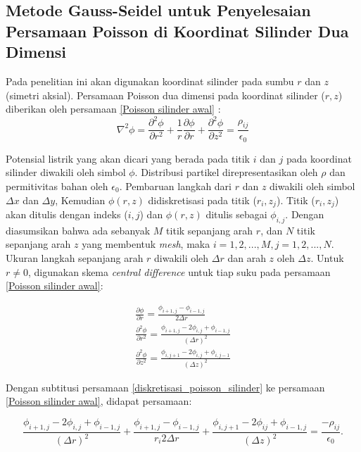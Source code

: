 \subsection{Metode Gauss-Seidel untuk Penyelesaian Persamaan Poisson di Koordinat Silinder Dua Dimensi}\label{gauss_seidel_silinder}
Pada penelitian ini akan digunakan koordinat silinder pada sumbu $r$ dan $z$ (simetri aksial). Persamaan Poisson dua dimensi pada koordinat silinder ($r, z$) diberikan oleh persamaan \eqref{Poisson silinder awal} \citep{Shiferaw2013}:
\begin{equation}\label{Poisson silinder awal}
    \nabla ^2 \phi = \frac{\partial^2\phi}{\partial r^2} + \frac{1}{r}\frac{\partial \phi}{\partial r}+\frac{\partial^2\phi}{\partial z^2}=\frac{\rho_{ij}}{\epsilon_0}
\end{equation}

Potensial listrik yang akan dicari yang berada pada titik $i$ dan $j$ pada koordinat silinder diwakili oleh simbol $\phi$. Distribusi partikel direpresentasikan oleh $\rho$ dan permitivitas bahan oleh $\epsilon_0$. Pembaruan langkah dari $r$ dan $z$ diwakili oleh simbol $\Delta x$ dan $\Delta y$, Kemudian $\phi(r,z)$ didiskretisasi pada titik ($r_i, z_j$). Titik ($r_i, z_j$) akan ditulis dengan indeks ($i,j$) dan $\phi(r,z)$ ditulis sebagai $\phi_{i,j}$. Dengan diasumsikan bahwa ada sebanyak $M$ titik sepanjang arah $r$, dan $N$ titik sepanjang arah $z$ yang membentuk \emph{mesh}, maka $i = 1,2,...,M, j=1,2,...,N$. Ukuran langkah sepanjang arah $r$ diwakili oleh $\Delta r$ dan arah $z$ oleh $\Delta z$. Untuk $r \neq 0$, digunakan skema \emph{central difference} untuk tiap suku pada persamaan \eqref{Poisson silinder awal}:

\begin{equation}\label{diskretisasi_poisson_silinder}
\begin{split}
    \frac{\partial \phi}{\partial r} = \frac{\phi_{i+1,j}-\phi_{i-1,j}}{2\Delta r}\\
    \frac{\partial^2 \phi}{\partial r^2} = \frac{\phi_{i+1,j}-2\phi_{i,j}+\phi_{i-1,j}}{(\Delta r)^2}\\
    \frac{\partial^2 \phi}{\partial z^2} = \frac{\phi_{i,j+1}-2\phi_{i,j}+\phi_{i,j-1}}{(\Delta z)^2}
\end{split}
\end{equation}

Dengan subtitusi persamaan \eqref{diskretisasi_poisson_silinder} ke persamaan \eqref{Poisson silinder awal}, didapat persamaan:

\begin{equation}
    \frac{\phi_{i+1,j}-2\phi_{i,j}+\phi_{i-1,j}}{(\Delta r)^2} + \frac{\phi_{i+1,j}-\phi_{i-1,j}}{r_i 2 \Delta r} + \frac{\phi_{i,j+1}-2\phi_{ij}+\phi_{i-1,j}}{(\Delta z)^2}=\frac{-\rho_{ij}}{\epsilon_0}.
\end{equation}

